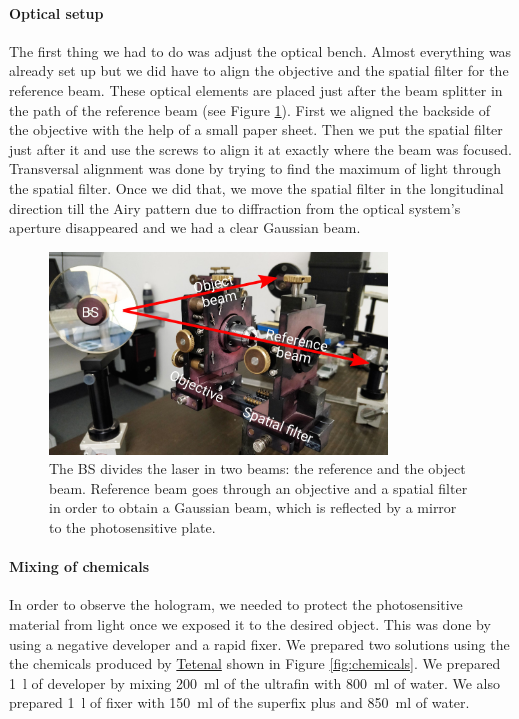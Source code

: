 \documentclass[11pt,a4paper]{article}
\begin{document}
\paragraph{Optical setup}
The first thing we had to do was adjust the optical bench. Almost everything was already set up but we did have to align the objective and the spatial filter for the reference beam. These optical elements are placed just after the beam splitter in the path of the reference beam (see Figure \ref{fig:optical_bench_1}). First we aligned the backside of the objective with the help of a small paper sheet. Then we put the spatial filter just after it and use the screws to align it at exactly where the beam was focused. Transversal alignment was done by trying to find the maximum of light through the spatial filter. Once we did that, we move the spatial filter in the longitudinal direction till the Airy pattern due to diffraction from the optical system's aperture disappeared and we had a clear Gaussian beam.

\begin{figure}[ht]
\centering
\includegraphics[width=0.8\textwidth]{Optical_bench_1}
\caption{The BS divides the laser in two beams: the reference and the object beam. Reference beam goes through an objective and a spatial filter in order to obtain a Gaussian beam, which is reflected by a mirror to the photosensitive plate.}
\label{fig:optical_bench_1}
\end{figure}

\paragraph{Mixing of chemicals}
In order to observe the hologram, we needed to protect the photosensitive material from light once we exposed it to the desired object. This was done by using a negative developer and a rapid fixer. We prepared two solutions using the the chemicals produced by \href{https://www.tetenal.com/}{Tetenal} shown in Figure \ref{fig:chemicals}. We prepared \SI{1}{\litre} of developer by mixing \SI{200}{\milli\litre} of the ultrafin with \SI{800}{\milli\litre} of water. We also prepared \SI{1}{\litre} of fixer with \SI{150}{\milli\litre} of the superfix plus and \SI{850}{\milli\litre} of water.
\end{document}
